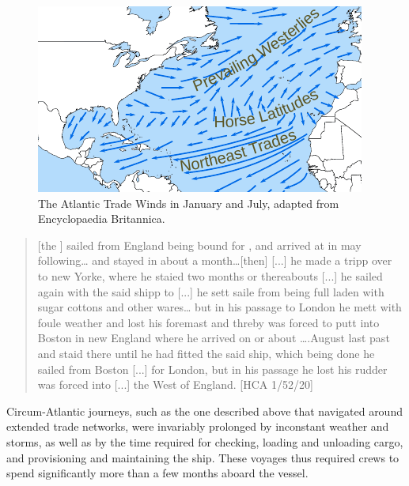 \begin{figure}
\caption{\label{fig:key:4.1} The Atlantic Trade Winds in January and July, adapted from Encyclopaedia Britannica.
%
}
 

\includegraphics[width=.8\textwidth]{figures/atlantic.pdf}
\end{figure}


\begin{quotation}
[the ] sailed from England being bound for , and arrived at  in may following… and stayed in  about a month…[then] [...] he made a tripp over to new Yorke, where he staied two months or thereabouts [...] he sailed again with the said shipp to  [...] he sett saile from  being full laden with sugar cottons and other wares… but in his passage to London he mett with foule weather and lost his foremast and threby was forced to putt into Boston in new England where he arrived on or about ….August last past and staid there until he had fitted the said ship, which being done he sailed from Boston [...] for London, but in his passage he lost his rudder was forced into [...] the West of England. [HCA 1/52/20]\end{quotation}

Circum-Atlantic journeys, such as the one described above that navigated around extended trade networks, were invariably prolonged by inconstant weather and storms, as well as by the time required for  checking, loading and unloading cargo, and provisioning and maintaining the ship. These voyages thus required crews to spend significantly more than a few months aboard the vessel. 


